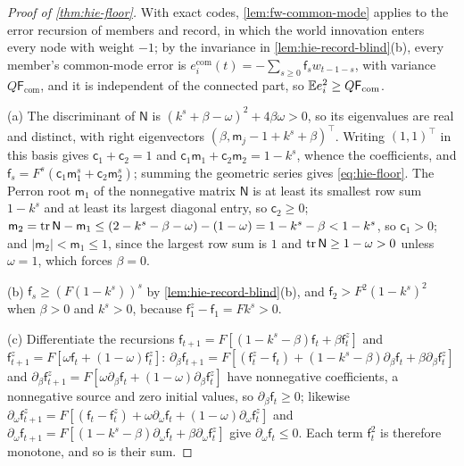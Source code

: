 \begin{proof}[Proof of \cref{thm:hie-floor}]
With exact codes, \cref{lem:fw-common-mode} applies to the error recursion of members and record, in which the world innovation enters every node with weight $-1$; by the invariance in \cref{lem:hie-record-blind}(b), every member's common-mode error is $e^{\mathrm{com}}_i(t)=-\sum_{s\ge0}\mathsf f_sw_{t-1-s}$, with variance $Q\mathsf F_{\mathrm{com}}$, and it is independent of the connected part, so $\mathbb{E} e_i^2\ge Q\mathsf F_{\mathrm{com}}$.

(a) The discriminant of $\mathsf N$ is $(k^s+\beta-\omega)^2+4\beta\omega>0$, so its eigenvalues are real and distinct, with right eigenvectors $(\beta,\mathsf m_j-1+k^s+\beta)^\top$. Writing $(1,1)^\top$ in this basis gives $\mathsf c_1+\mathsf c_2=1$ and $\mathsf c_1\mathsf m_1+\mathsf c_2\mathsf m_2=1-k^s$, whence the coefficients, and $\mathsf f_s=F^s(\mathsf c_1\mathsf m_1^s+\mathsf c_2\mathsf m_2^s)$; summing the geometric series gives \eqref{eq:hie-floor}. The Perron root $\mathsf m_1$ of the nonnegative matrix $\mathsf N$ is at least its smallest row sum $1-k^s$ and at least its largest diagonal entry, so $\mathsf c_2\ge0$; $\mathsf m_2=\operatorname{tr}\mathsf N-\mathsf m_1\le(2-k^s-\beta-\omega)-(1-\omega)=1-k^s-\beta<1-k^s$, so $\mathsf c_1>0$; and $\lvert\mathsf m_2\rvert<\mathsf m_1\le1$, since the largest row sum is $1$ and $\operatorname{tr}\mathsf N\ge1-\omega>0$ unless $\omega=1$, which forces $\beta=0$.

(b) $\mathsf f_s\ge(F(1-k^s))^s$ by \cref{lem:hie-record-blind}(b), and $\mathsf f_2>F^2(1-k^s)^2$ when $\beta>0$ and $k^s>0$, because $\mathsf f^z_1-\mathsf f_1=Fk^s>0$.

(c) Differentiate the recursions $\mathsf f_{t+1}=F[(1-k^s-\beta)\mathsf f_t+\beta\mathsf f^z_t]$ and $\mathsf f^z_{t+1}=F[\omega\mathsf f_t+(1-\omega)\mathsf f^z_t]$: $\partial_\beta\mathsf f_{t+1}=F[(\mathsf f^z_t-\mathsf f_t)+(1-k^s-\beta)\partial_\beta\mathsf f_t+\beta\partial_\beta\mathsf f^z_t]$ and $\partial_\beta\mathsf f^z_{t+1}=F[\omega\partial_\beta\mathsf f_t+(1-\omega)\partial_\beta\mathsf f^z_t]$ have nonnegative coefficients, a nonnegative source and zero initial values, so $\partial_\beta\mathsf f_t\ge0$; likewise $\partial_\omega\mathsf f^z_{t+1}=F[(\mathsf f_t-\mathsf f^z_t)+\omega\partial_\omega\mathsf f_t+(1-\omega)\partial_\omega\mathsf f^z_t]$ and $\partial_\omega\mathsf f_{t+1}=F[(1-k^s-\beta)\partial_\omega\mathsf f_t+\beta\partial_\omega\mathsf f^z_t]$ give $\partial_\omega\mathsf f_t\le0$. Each term $\mathsf f_t^2$ is therefore monotone, and so is their sum.


\end{proof}
